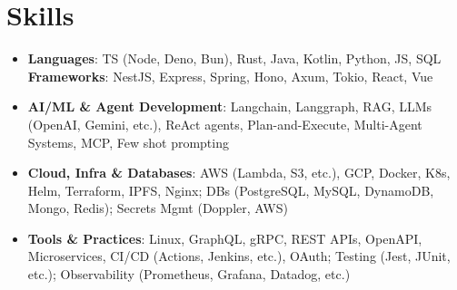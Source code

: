 \documentclass[letterpaper,11pt]{article}
\newcommand{\resumeSubHeadingListStart}{\begin{itemize}[leftmargin=*]}
\newcommand{\resumeSubHeadingListEnd}{\end{itemize}}
\begin{document}
\section{Skills}
  \resumeSubHeadingListStart
    \item{ \textbf{Languages}{: TS (Node, Deno, Bun), Rust, Java, Kotlin, Python, JS, SQL} \hfill \textbf{Frameworks}{: NestJS, Express, Spring, Hono, Axum, Tokio, React, Vue} }
    \item{ \textbf{AI/ML \& Agent Development}{: Langchain, Langgraph, RAG, LLMs (OpenAI, Gemini, etc.), ReAct agents, Plan-and-Execute, Multi-Agent Systems, MCP, Few shot prompting} }
    \item{ \textbf{Cloud, Infra \& Databases}{: AWS (Lambda, S3, etc.), GCP, Docker, K8s, Helm, Terraform, IPFS, Nginx; DBs (PostgreSQL, MySQL, DynamoDB, Mongo, Redis); Secrets Mgmt (Doppler, AWS)} }
    \item{ \textbf{Tools \& Practices}{: Linux, GraphQL, gRPC, REST APIs, OpenAPI, Microservices, CI/CD (Actions, Jenkins, etc.), OAuth; Testing (Jest, JUnit, etc.); Observability (Prometheus, Grafana, Datadog, etc.)} }
  \resumeSubHeadingListEnd


\end{document}
